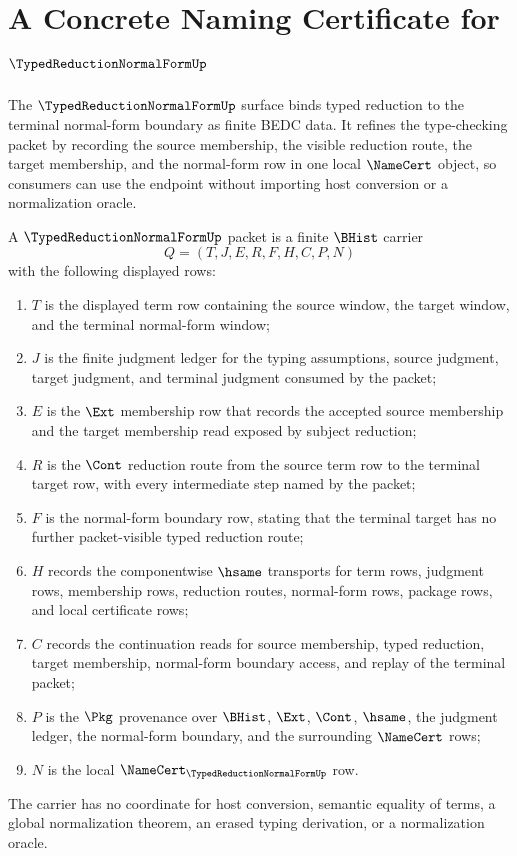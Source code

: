 \chapter{A Concrete Naming Certificate for $\TypedReductionNormalFormUp$}
\label{ch:concrete-instances-typedreductionnormalform-namecert}

The $\TypedReductionNormalFormUp$ surface binds typed reduction to the terminal normal-form boundary as finite BEDC data. It refines the type-checking packet by recording the source membership, the visible reduction route, the target membership, and the normal-form row in one local $\NameCert$ object, so consumers can use the endpoint without importing host conversion or a normalization oracle.

\begin{definition}
\label{def:typed-reduction-normal-form-packet}
A $\TypedReductionNormalFormUp$ packet is a finite $\BHist$ carrier
$$
Q=(T,J,E,R,F,H,C,P,N)
$$
with the following displayed rows:
\begin{enumerate}
\item $T$ is the displayed term row containing the source window, the target window, and the terminal normal-form window;
\item $J$ is the finite judgment ledger for the typing assumptions, source judgment, target judgment, and terminal judgment consumed by the packet;
\item $E$ is the $\Ext$ membership row that records the accepted source membership and the target membership read exposed by subject reduction;
\item $R$ is the $\Cont$ reduction route from the source term row to the terminal target row, with every intermediate step named by the packet;
\item $F$ is the normal-form boundary row, stating that the terminal target has no further packet-visible typed reduction route;
\item $H$ records the componentwise $\hsame$ transports for term rows, judgment rows, membership rows, reduction routes, normal-form rows, package rows, and local certificate rows;
\item $C$ records the continuation reads for source membership, typed reduction, target membership, normal-form boundary access, and replay of the terminal packet;
\item $P$ is the $\Pkg$ provenance over $\BHist$, $\Ext$, $\Cont$, $\hsame$, the judgment ledger, the normal-form boundary, and the surrounding $\NameCert$ rows;
\item $N$ is the local $\NameCert_{\TypedReductionNormalFormUp}$ row.
\end{enumerate}
The carrier has no coordinate for host conversion, semantic equality of terms, a global normalization theorem, an erased typing derivation, or a normalization oracle.
\end{definition}

